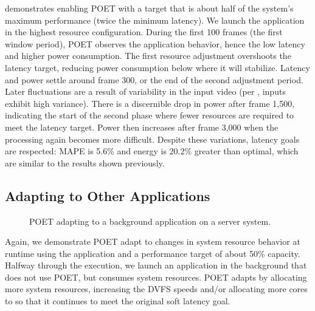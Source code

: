  demonstrates enabling POET with a target that is about half of the system's maximum performance (twice the minimum latency).
We launch the application in the highest resource configuration.
During the first 100 frames (the first window period), POET observes the application behavior, hence the low latency and higher power consumption.
The first resource adjustment overshoots the latency target, reducing power consumption below where it will stabilize.
Latency and power settle around frame 300, or the end of the second adjustment period.
Later fluctuations are a result of variability in the input video (per ,  inputs exhibit high variance).
There is a discernible drop in power after frame 1,500, indicating the start of the second phase where fewer resources are required to meet the latency target.
Power then increases after frame 3,000 when the processing again becomes more difficult.
Despite these variations, latency goals are respected: MAPE is 5.6\% and energy is 20.2\% greater than optimal, which are similar to the  results shown previously.


\subsection{Adapting to Other Applications}

\begin{figure}[t]
  \centering
      
  \caption{POET adapting to a background application on a server system.}
  \label{fig:poet-server-multiapp}
\end{figure}

Again, we demonstrate POET adapt to changes in system resource behavior at runtime using the  application and a performance target of about 50\% capacity.
Halfway through the execution, we launch an application in the background that does not use POET, but consumes system resources.
POET adapts by allocating more system resources, \ie increasing the DVFS speeds and/or allocating more cores to  so that it continues to meet the original soft latency goal.

